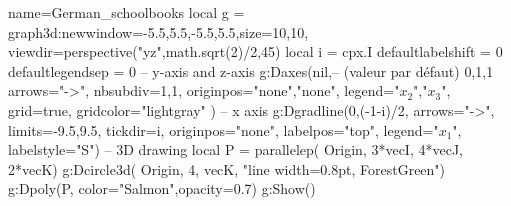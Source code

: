 \documentclass[10pt]{standalone}
\begin{document}
\tikzset{>=latex}%

\begin{luadraw}{name=German_schoolbooks}
local g = graph3d:new{window={-5.5,5.5,-5.5,5.5},size={10,10}, viewdir=perspective("yz",math.sqrt(2)/2,45)}
local i = cpx.I
defaultlabelshift = 0
defaultlegendsep = 0
-- y-axis and z-axis
g:Daxes(nil,-- (valeur par défaut) {0,1,1}
    {   arrows="->",
        nbsubdiv={1,1},
        originpos={"none","none"},
        legend={"$x_2$","$x_3$"},
        grid=true,
        gridcolor="lightgray"
    })
-- x axis
g:Dgradline({0,(-1-i)/2}, {arrows="->", limits={-9.5,9.5}, tickdir=i, originpos="none", labelpos="top", legend="$x_1$", labelstyle="S"})
-- 3D drawing
local P = parallelep( Origin, 3*vecI, 4*vecJ, 2*vecK)
g:Dcircle3d( Origin, 4, vecK, "line width=0.8pt, ForestGreen")
g:Dpoly(P, {color="Salmon",opacity=0.7})
g:Show()
\end{luadraw}
\end{document}
